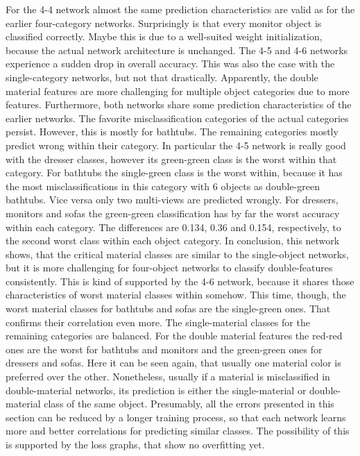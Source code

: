For the 4-4 network almost the same prediction characteristics are valid as for the earlier four-category networks.
Surprisingly is that every monitor object is classified correctly.
Maybe this is due to a well-suited weight initialization, because the actual network architecture is unchanged.
The 4-5 and 4-6 networks experience a sudden drop in overall accuracy.
This was also the case with the single-category networks, but not that drastically.
Apparently, the double material features are more challenging for multiple object categories due to more features.
Furthermore, both networks share some prediction characteristics of the earlier networks.
The favorite misclassification categories of the actual categories persist.
However, this is mostly for bathtubs.
The remaining categories mostly predict wrong within their category.
In particular the 4-5 network is really good with the dresser classes, however its green-green class is the worst within that category.
For bathtubs the single-green class is the worst within, because it has the most misclassifications in this category with 6 objects as double-green bathtubs.
Vice versa only two multi-views are predicted wrongly.
For dressers, monitors and sofas the green-green classification has by far the worst accuracy within each category.
The differences are 0.134, 0.36 and 0.154, respectively, to the second worst class within each object category.
In conclusion, this network shows, that the critical material classes are similar to the single-object networks, but it is more challenging for four-object networks to classify double-features consistently.
This is kind of supported by the 4-6 network, because it shares those characteristics of worst material classes within somehow.
This time, though, the worst material classes for bathtubs and sofas are the single-green ones.
That confirms their correlation even more.
The single-material classes for the remaining categories are balanced.
For the double material features the red-red ones are the worst for bathtubs and monitors and the green-green ones for dressers and sofas.
Here it can be seen again, that usually one material color is preferred over the other.
Nonetheless, usually if a material is misclassified in double-material networks, its prediction is either the single-material or double-material class of the same object.
Presumably, all the errors presented in this section can be reduced by a longer training process, so that each network learns more and better correlations for predicting similar classes.
The possibility of this is supported by the loss graphs, that show no overfitting yet.
